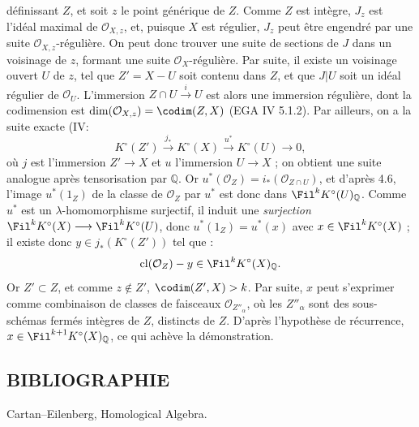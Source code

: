 définissant \(Z\), et soit \(z\) le point générique de \(Z\). Comme \(Z\) est intègre, \(J_z\) est l'idéal maximal de \(\mathcal O_{X,z}\), et, puisque \(X\) est régulier, \(J_z\) peut être engendré par une suite \(\mathcal O_{X,z}\)-régulière. On peut donc trouver une suite de sections de \(J\) dans un voisinage de \(z\), formant une suite \(\mathcal O_X\)-régulière. Par suite, il existe un voisinage ouvert \(U\) de \(z\), tel que \(Z'=X-U\) soit contenu dans \(Z\), et que \(J|U\) soit un idéal régulier de \(\mathcal O_U\). L'immersion \(Z\cap U\xrightarrow{i}U\) est alors une immersion régulière, dont la codimension est \(\dim(\mathcal O_{X,z})=\codim(Z,X)\) (EGA IV 5.1.2). Par ailleurs, on a la suite exacte (IV\qquad :
\[
  K^\circ(Z')\xrightarrow{j_*}K^\circ(X)
  \xrightarrow{u^*}K^\circ(U)\to0,
\]
où \(j\) est l'immersion \(Z'\to X\) et \(u\) l'immersion \(U\to X\) ; on obtient une suite analogue après tensorisation par \(\mathbb Q\). Or \(u^*(\mathcal O_Z)=i_*(\mathcal O_{Z\cap U})\), et d'après 4.6, l'image \(u^*(1_Z)\) de la classe de \(\mathcal O_Z\) par \(u^*\) est donc dans \(\Fil^kK^\circ(U)_{\mathbb Q}\). Comme \(u^*\) est un \(\lambda\)-homomorphisme surjectif, il induit une \emph{surjection} \(\Fil^kK^\circ(X)\longrightarrow \Fil^kK^\circ(U)\), donc \(u^*(1_Z)=u^*(x)\) avec \(x\in\Fil^kK^\circ(X)\) ; il existe donc \(y\in j_*(K^\circ(Z'))\) tel que :
\[
  \operatorname{cl}(\mathcal O_Z)-y\in\Fil^kK^\circ(X)_{\mathbb Q}.
\]
Or \(Z'\subset Z\), et comme \(z\notin Z'\), \(\codim(Z',X)>k\). Par suite, \(x\) peut s'exprimer comme combinaison de classes de faisceaux \(\mathcal O_{Z''_\alpha}\), où les \(Z''_\alpha\) sont des sous-schémas fermés intègres de \(Z\), distincts de \(Z\). D'après l'hypothèse de récurrence, \(x\in\Fil^{k+1}K^\circ(X)_{\mathbb Q}\), ce qui achève la démonstration.

\subsection*{BIBLIOGRAPHIE}
\begin{enumerate}[label={[\arabic*]}]
\item Cartan--Eilenberg, Homological Algebra.
\end{enumerate}



\providecommand{\etale}{\'etale}
\providecommand{\Ch}{\operatorname{Ch}}


